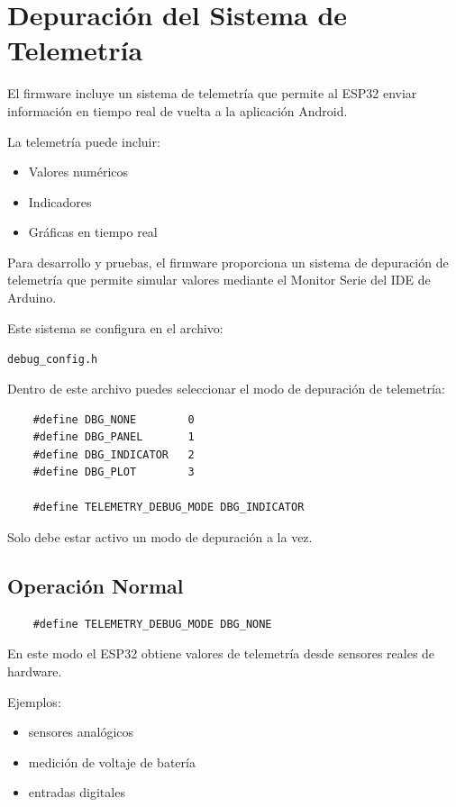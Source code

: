 \section{Depuración del Sistema de Telemetría}

El firmware incluye un sistema de telemetría que permite al ESP32 enviar
información en tiempo real de vuelta a la aplicación Android.

La telemetría puede incluir:

\begin{itemize}
    \item Valores numéricos
    \item Indicadores
    \item Gráficas en tiempo real
\end{itemize}

Para desarrollo y pruebas, el firmware proporciona un sistema de depuración de telemetría
que permite simular valores mediante el Monitor Serie del IDE de Arduino.

Este sistema se configura en el archivo:

\begin{center}
    \texttt{debug\_config.h}
\end{center}

Dentro de este archivo puedes seleccionar el modo de depuración de telemetría:

\begin{verbatim}
    #define DBG_NONE        0
    #define DBG_PANEL       1
    #define DBG_INDICATOR   2
    #define DBG_PLOT        3

    #define TELEMETRY_DEBUG_MODE DBG_INDICATOR
\end{verbatim}

Solo debe estar activo un modo de depuración a la vez.

\subsection{Operación Normal}

\begin{verbatim}
    #define TELEMETRY_DEBUG_MODE DBG_NONE
\end{verbatim}

En este modo el ESP32 obtiene valores de telemetría desde sensores reales de hardware.

Ejemplos:

\begin{itemize}
    \item sensores analógicos
    \item medición de voltaje de batería
    \item entradas digitales
\end{itemize}

